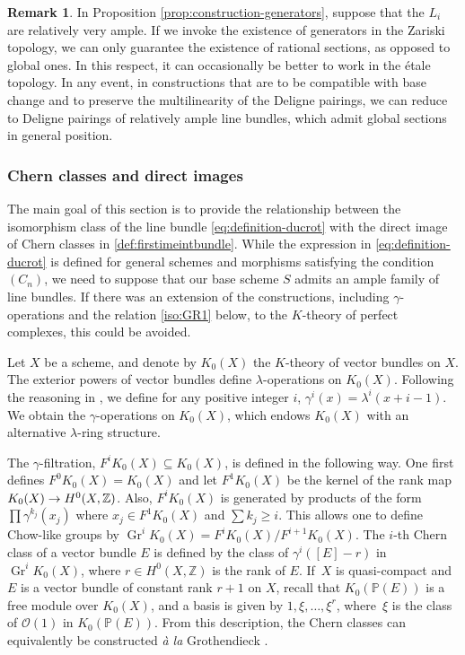 \documentclass[11pt]{article}
\theoremstyle{plain}
\theoremstyle{definition}
\newtheorem{remark}[theorem]{Remark}
\newcommand{\PBbb}{\mathbb P}
\newcommand{\ZBbb}{\mathbb Z}
\newcommand{\Ocal}{\mathcal O}
\DeclareMathOperator{\Gr}{Gr}
\begin{document}
\begin{remark}
In Proposition \ref{prop:construction-generators}, suppose that the $L_{i}$ are relatively very ample. If we invoke the existence of generators in the Zariski topology, we can only guarantee the existence of rational sections, as opposed to global ones. In this respect, it can occasionally be better to work in the étale topology. In any event, in constructions that are to be compatible with base change and to preserve the multilinearity of the Deligne pairings, we can reduce to Deligne pairings of relatively ample line bundles, which admit global sections in general position.
\end{remark}

\subsubsection{Chern classes and direct images}\label{subsub:Cherndirect}

The main goal of this section is to provide the relationship between the isomorphism class of the line bundle \eqref{eq:definition-ducrot} with the direct image of Chern classes in \eqref{def:firstimeintbundle}. While the expression in \eqref{eq:definition-ducrot} is defined for general schemes and morphisms satisfying the condition $(C_n)$, we need to suppose that our base scheme $S$ admits an ample family of line bundles. If there was an extension of the constructions, including $\gamma$-operations and the relation \eqref{iso:GR1} below, to the $K$-theory of perfect complexes, this could be avoided.

Let $X$ be a scheme, and denote by $K_{0}(X)$ the $K$-theory of vector bundles on $X$. The exterior powers of vector bundles define $\lambda$-operations on $K_0(X)$. Following the reasoning in \cite[Exp.\,V, \S 3]{SGA6}, we define for any positive integer $i$, $\gamma^i(x) = \lambda^i(x+i-1)$. We obtain the $\gamma$-operations on $K_0(X)$, which endows $K_0(X)$ with an alternative $\lambda$\nobreakdash-ring structure.

The $\gamma$-filtration, $F^i K_0(X) \subseteq K_0(X)$, is defined in the following way. One first defines \hbox{$F^0 K_0(X) =K_0(X)$} and let $F^1 K_0(X)$ be the kernel of the rank map $K_0(X) \to\nobreak H^0(X, \mathbb{Z})$. Also, $F^i K_0(X)$ is generated by products of the form $\prod \gamma^{k_j}(x_j)$ where $x_j \in F^1 K_0(X)$ and $\sum k_j \geq i$. This allows one to define Chow-like groups by $\Gr^i K_0(X) = F^i K_0(X)/F^{i+1}K_0(X)$. The $i$-th Chern class of a vector bundle $E$ is defined by the class of $\gamma^{i}([E]-r)$ in $\Gr^i K_0(X)$, where $r \in H^0(X, \ZBbb)$ is the rank of $E$. If~$X$ is quasi-compact and $E$ is a vector bundle of constant rank $r+1$ on $X$, recall that $K_{0}(\PBbb(E))$ is a free module over $K_{0}(X)$, and a basis is given by $1,\xi,\ldots, \xi^{r}$, where~$\xi$ is the class of $\Ocal(1)$ in $K_{0}(\PBbb(E))$. From this description, the Chern classes can equivalently be constructed \emph{à la} Grothendieck \cite[Exp.\,VI, \S 5]{SGA6}.
\end{document}
